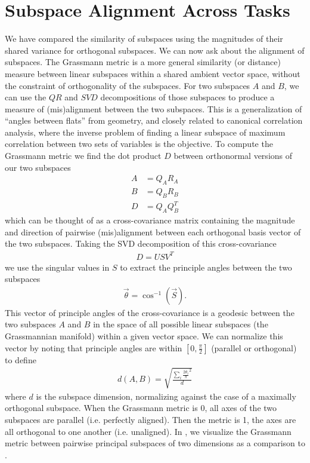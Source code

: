 \documentclass[../main.tex]{subfiles}
\begin{document}
\section{Subspace Alignment Across Tasks}


We have compared the similarity of subspaces using the magnitudes of their shared variance for orthogonal subspaces. We can now ask about the alignment of subspaces. The Grassmann metric is a more general similarity (or distance) measure between linear subspaces within a shared ambient vector space, without the constraint of orthogonality of the subspaces\cite{eschenburgDistancesSubspaces2022}. For two subspaces $A$ and $B$, we can use the $QR$ and $SVD$ decompositions of those subspaces to produce a measure of (mis)alignment between the two subspaces. This is a generalization of ``angles between flats'' from geometry, and closely related to canonical correlation analysis, where the inverse problem of finding a linear subspace of maximum correlation between two sets of variables is the objective. To compute the Grassmann metric we find the dot product $D$ between orthonormal versions of our two subspaces
%
\begin{align}
  A &= Q_AR_A \\ 
  B &= Q_BR_B \\
  D &= Q_AQ_B^T
\end{align}
%
which can be thought of as a cross-covariance matrix containing the magnitude and direction of pairwise (mis)alignment between each orthogonal basis vector of the two subspaces. Taking the SVD decomposition of this cross-covariance
%
\begin{align}
  D = USV^T
\end{align}
%
we use the singular values in $S$ to extract the principle angles between the two subspaces
%
\begin{align}
  \vec{\theta} = \cos^{-1}({\vec{S}}).
\end{align}
%
This vector of principle angles of the cross-covariance is a geodesic between the two subspaces $A$ and $B$ in the space of all possible linear subspaces (the Grassmannian manifold) within a given vector space. We can normalize this vector by noting that principle angles are within $[0,\frac{\pi}{2}]$ (parallel or orthogonal) to define
%
\begin{align}
  d(A,B) = \sqrt{\frac{\sum_{i}^{}{{\frac{2\theta_i}{\pi}}^2}}{d}}
\end{align}
%
where $d$ is the subspace dimension, normalizing against the case of a maximally orthogonal subspace. When the Grassmann metric is 0, all axes of the two subspaces are parallel (i.e. perfectly aligned). Then the metric is 1, the axes are all orthogonal to one another (i.e. unaligned). In , we visualize the Grassmann metric between pairwise principal subspaces of two dimensions as a comparison to .
\end{document}
